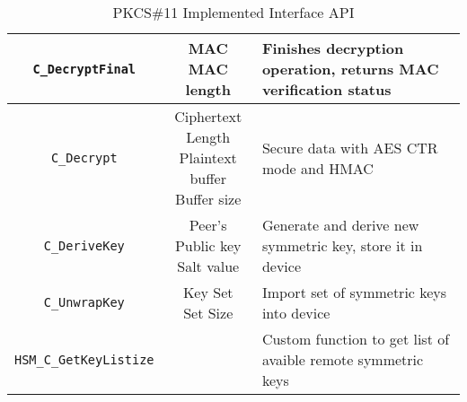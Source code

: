 \begin{table}[]
\begin{tabular}{|c|c|l|}
	\texttt{C\_DecryptFinal}	& \makecell{MAC\\MAC length} & Finishes decryption operation, returns MAC verification status\\ \hline
	\texttt{C\_Decrypt}		& \makecell{Ciphertext\\Length\\Plaintext buffer\\Buffer size} & Secure data with AES CTR mode and HMAC\\ \hline
	\texttt{C\_DeriveKey}		& \makecell{Peer's Public key\\Salt value} & Generate and derive new symmetric key, store it in device \\ \hline
	\texttt{C\_UnwrapKey}		& \makecell{Key Set\\Set Size} & Import set of symmetric keys into device\\ \hline
	\texttt{HSM\_C\_GetKeyListize}	& & Custom function to get list of avaible remote symmetric keys\\ \hline
\end{tabular}
\caption{PKCS\#11 Implemented Interface API}
\label{tab:pkcs11-api}
\end{table}
